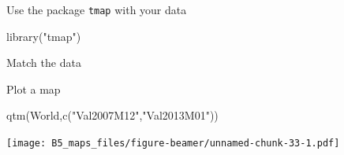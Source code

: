 \documentclass[
  10pt,
  ignorenonframetext,
]{beamer}
\newenvironment{Shaded}{\begin{snugshade}}{\end{snugshade}}
\newcommand{\DecValTok}[1]{\textcolor[rgb]{0.86,0.86,0.80}{#1}}
\newcommand{\KeywordTok}[1]{\textcolor[rgb]{0.94,0.87,0.69}{#1}}
\newcommand{\NormalTok}[1]{\textcolor[rgb]{0.80,0.80,0.80}{#1}}
\newcommand{\OperatorTok}[1]{\textcolor[rgb]{0.94,0.94,0.82}{#1}}
\newcommand{\StringTok}[1]{\textcolor[rgb]{0.80,0.58,0.58}{#1}}
\begin{document}
\begin{frame}[fragile]{Use the package \texttt{tmap} with your data}
\protect\hypertarget{use-the-package-tmap-with-your-data}{}

\begin{Shaded}
\begin{Highlighting}[]
\KeywordTok{library}\NormalTok{(}\StringTok{"tmap"}\NormalTok{)}
\end{Highlighting}
\end{Shaded}

\begin{block}{Match the data}

\begin{Shaded}
\end{Shaded}

\end{block}

\end{frame}

\begin{frame}[fragile]{Plot a map}
\protect\hypertarget{plot-a-map}{}

\begin{Shaded}
\begin{Highlighting}[]
\KeywordTok{qtm}\NormalTok{(World,}\KeywordTok{c}\NormalTok{(}\StringTok{"Val2007M12"}\NormalTok{,}\StringTok{"Val2013M01"}\NormalTok{))}
\end{Highlighting}
\end{Shaded}

\texttt{[image: B5\_maps\_files/figure-beamer/unnamed-chunk-33-1.pdf]}

\end{frame}
\end{document}
